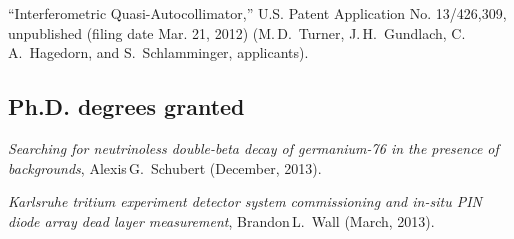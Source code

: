 ``Interferometric Quasi-Autocollimator,'' U.S. Patent Application No. 13/426,309, unpublished (filing date Mar. 21, 2012) (M.\,D.~Turner, J.\,H.~Gundlach, C.\,A.~Hagedorn, and S.~Schlamminger, applicants). 

%
%
%
\subsection{Ph.D. degrees granted}
%
%
%
{\it Searching for neutrinoless double-beta decay of germanium-76 in the presence of backgrounds}, Alexis\,G.~Schubert (December, 2013).

{\it Karlsruhe tritium experiment detector system commissioning and in-situ PIN diode array dead layer measurement}, Brandon\,L.~Wall (March, 2013).
